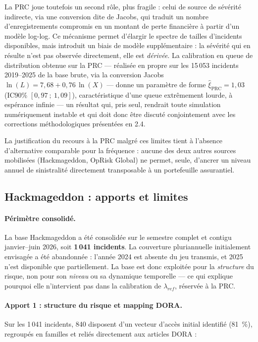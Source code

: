 \documentclass[11pt,a4paper]{article}
\theoremstyle{navystyle}
\theoremstyle{navydef}
\begin{document}
La PRC joue toutefois un second rôle, plus fragile : celui de source de
sévérité indirecte, via une conversion dite de Jacobs, qui traduit un nombre
d'enregistrements compromis en un montant de perte financière à partir d'un
modèle log-log. Ce mécanisme permet d'élargir le spectre de tailles
d'incidents disponibles, mais introduit un biais de modèle supplémentaire :
la sévérité qui en résulte n'est pas observée directement, elle est
\emph{dérivée}. La calibration en queue de distribution obtenue sur la PRC
--- réalisée en propre sur les 15\,053 incidents 2019--2025 de la base brute,
via la conversion Jacobs $\ln(L) = 7{,}68 + 0{,}76\,\ln(X)$ --- donne un
paramètre de forme $\hat{\xi}_{\text{PRC}} = 1{,}03$ (IC90\%
$[0{,}97~;~1{,}09]$), caractéristique d'une queue extrêmement lourde, à
espérance infinie --- un résultat qui, pris seul, rendrait toute simulation
numériquement instable et qui doit donc être discuté conjointement avec les
corrections méthodologiques présentées en 2.4.

La justification du recours à la PRC malgré ces limites tient à l'absence
d'alternative comparable pour la fréquence : aucune des deux autres sources
mobilisées (Hackmageddon, OpRisk Global) ne permet, seule, d'ancrer un niveau
annuel de sinistralité directement transposable à un portefeuille assurantiel.

\subsection{Hackmageddon : apports et limites}

\paragraph{Périmètre consolidé.} La base Hackmageddon a été consolidée sur le
semestre complet et contigu janvier--juin 2026, soit \textbf{1\,041
incidents}. La couverture pluriannuelle initialement envisagée a été
abandonnée : l'année 2024 est absente du jeu transmis, et 2025 n'est
disponible que partiellement. La base est donc exploitée pour la
\emph{structure} du risque, non pour son \emph{niveau} ou sa dynamique
temporelle --- ce qui explique pourquoi elle n'intervient pas dans la
calibration de $\lambda_{ref}$, réservée à la PRC.

\paragraph{Apport 1 : structure du risque et mapping DORA.} Sur les 1\,041
incidents, 840 disposent d'un vecteur d'accès initial identifié (81~\%),
regroupés en familles et reliés directement aux articles DORA :
\end{document}
